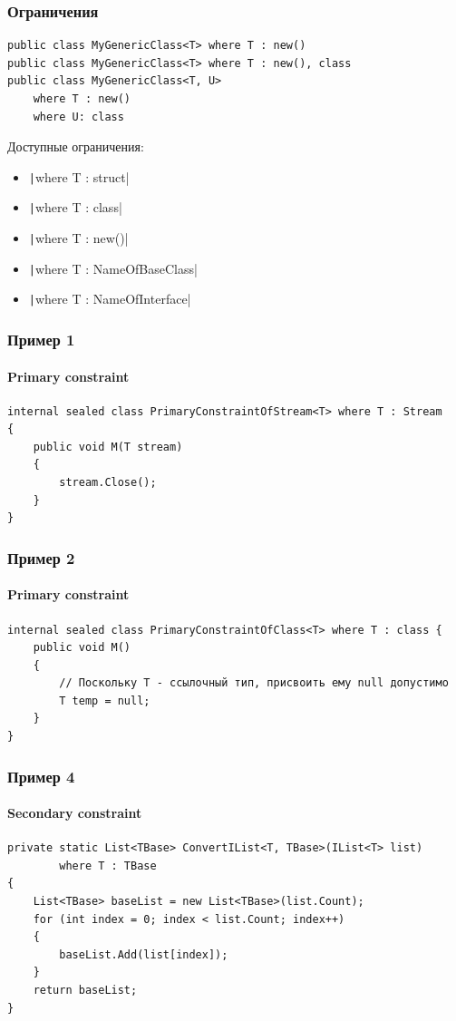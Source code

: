 \documentclass[xetex,mathserif,serif]{beamer}
\begin{document}
	\begin{frame}[fragile]
		\frametitle{Ограничения}
		\begin{verbatim}
public class MyGenericClass<T> where T : new()
public class MyGenericClass<T> where T : new(), class
public class MyGenericClass<T, U> 
    where T : new() 
    where U: class
		\end{verbatim}

		Доступные ограничения:
		\begin{itemize}
			\item \texttt|where T : struct|
			\item \texttt|where T : class|
			\item \texttt|where T : new()|
			\item \texttt|where T : NameOfBaseClass|
			\item \texttt|where T : NameOfInterface|
		\end{itemize}
	\end{frame}

	\begin{frame}[fragile]
		\frametitle{Пример 1}
		\framesubtitle{Primary constraint}
		\begin{footnotesize}
			\begin{verbatim}
internal sealed class PrimaryConstraintOfStream<T> where T : Stream 
{
    public void M(T stream) 
    {
        stream.Close();
    }
}
			\end{verbatim}
		\end{footnotesize}
	\end{frame}

	\begin{frame}[fragile]
		\frametitle{Пример 2}
		\framesubtitle{Primary constraint}
		\begin{footnotesize}
			\begin{verbatim}
internal sealed class PrimaryConstraintOfClass<T> where T : class {
    public void M() 
    {
        // Поскольку T - ссылочный тип, присвоить ему null допустимо
        T temp = null;
    }
}
			\end{verbatim}
		\end{footnotesize}
	\end{frame}

	\begin{frame}[fragile]
		\frametitle{Пример 4}
		\framesubtitle{Secondary constraint}
		\begin{footnotesize}
			\begin{verbatim}
private static List<TBase> ConvertIList<T, TBase>(IList<T> list)
        where T : TBase 
{
    List<TBase> baseList = new List<TBase>(list.Count);
    for (int index = 0; index < list.Count; index++) 
    {
        baseList.Add(list[index]);
    }
    return baseList;
}
			\end{verbatim}
		\end{footnotesize}
	\end{frame}
\end{document}
